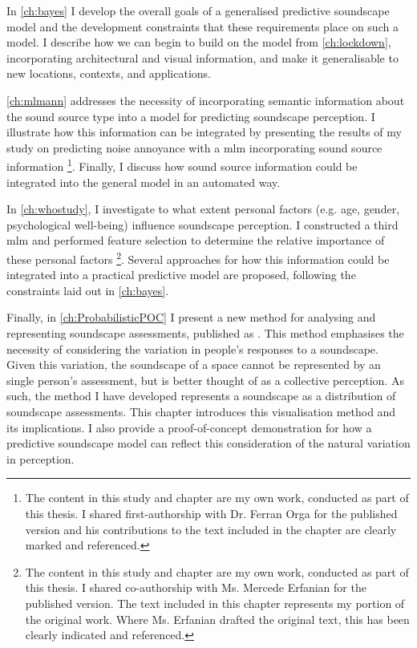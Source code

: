 \documentclass[oneside,fontsize=11pt,titlepage,chapterprefix=true
]{scrbook}
\begin{document}
In \cref{ch:bayes} I develop the overall goals of a generalised predictive soundscape model and the development constraints that these requirements place on such a model. I describe how we can begin to build on the model from \cref{ch:lockdown}, incorporating architectural and visual information, and make it generalisable to new locations, contexts, and applications.

\cref{ch:mlmann} addresses the necessity of incorporating semantic information about the sound source type into a model for predicting soundscape perception. I illustrate how this information can be integrated by presenting the results of my study on predicting noise annoyance with a \gls{mlm} incorporating sound source information \citep{Orga2021Multilevel}\footnote{The content in this study and chapter are my own work, conducted as part of this thesis. I shared first-authorship with Dr. Ferran Orga for the published version and his contributions to the text included in the chapter are clearly marked and referenced. }. Finally, I discuss how sound source information could be integrated into the general model in an automated way.

In \cref{ch:whostudy}, I investigate to what extent personal factors (e.g. age, gender, psychological well-being) influence soundscape perception. I constructed a third \gls{mlm} and performed feature selection to determine the relative importance of these personal factors \citep{Erfanian2021Psychological}\footnote{The content in this study and chapter are my own work, conducted as part of this thesis. I shared co-authorship with Ms. Mercede Erfanian for the published version. The text included in this chapter represents my portion of the original work. Where Ms. Erfanian drafted the original text, this has been clearly indicated and referenced.}. Several approaches for how this information could be integrated into a practical predictive model are proposed, following the constraints laid out in \cref{ch:bayes}.

Finally, in \cref{ch:ProbabilisticPOC} I present a new method for analysing and representing soundscape assessments, published as \citet{Mitchell2022How}. This method emphasises the necessity of considering the variation in people's responses to a soundscape. Given this variation, the soundscape of a space cannot be represented by an single person's assessment, but is better thought of as a collective perception. As such, the method I have developed represents a soundscape as a distribution of soundscape assessments. This chapter introduces this visualisation method and its implications. I also provide a proof-of-concept demonstration for how a predictive soundscape model can reflect this consideration of the natural variation in perception.
\end{document}
